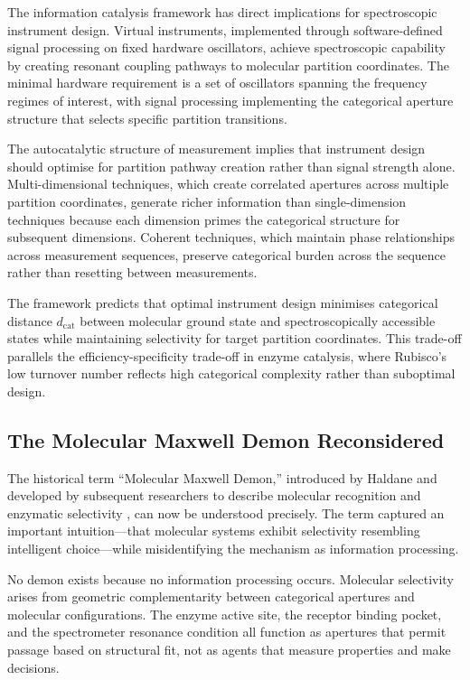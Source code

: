 \documentclass[twocolumn,10pt,a4paper]{article}
\theoremstyle{definition}
\theoremstyle{remark}
\newcommand{\dcat}{d_{\mathrm{cat}}}
\begin{document}
The information catalysis framework has direct implications for spectroscopic instrument design. Virtual instruments, implemented through software-defined signal processing on fixed hardware oscillators, achieve spectroscopic capability by creating resonant coupling pathways to molecular partition coordinates. The minimal hardware requirement is a set of oscillators spanning the frequency regimes of interest, with signal processing implementing the categorical aperture structure that selects specific partition transitions.

The autocatalytic structure of measurement implies that instrument design should optimise for partition pathway creation rather than signal strength alone. Multi-dimensional techniques, which create correlated apertures across multiple partition coordinates, generate richer information than single-dimension techniques because each dimension primes the categorical structure for subsequent dimensions. Coherent techniques, which maintain phase relationships across measurement sequences, preserve categorical burden across the sequence rather than resetting between measurements.

The framework predicts that optimal instrument design minimises categorical distance $\dcat$ between molecular ground state and spectroscopically accessible states while maintaining selectivity for target partition coordinates. This trade-off parallels the efficiency-specificity trade-off in enzyme catalysis, where Rubisco's low turnover number reflects high categorical complexity rather than suboptimal design.

\subsection{The Molecular Maxwell Demon Reconsidered}

The historical term ``Molecular Maxwell Demon,'' introduced by Haldane and developed by subsequent researchers to describe molecular recognition and enzymatic selectivity \citep{haldane1930}, can now be understood precisely. The term captured an important intuition---that molecular systems exhibit selectivity resembling intelligent choice---while misidentifying the mechanism as information processing.

No demon exists because no information processing occurs. Molecular selectivity arises from geometric complementarity between categorical apertures and molecular configurations. The enzyme active site, the receptor binding pocket, and the spectrometer resonance condition all function as apertures that permit passage based on structural fit, not as agents that measure properties and make decisions.
\end{document}

